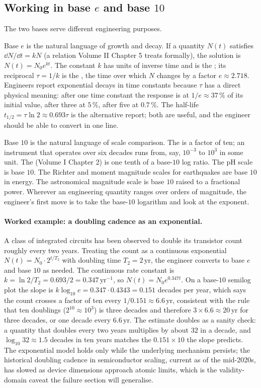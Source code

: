 \subsection{Working in base $e$ and base $10$}

The two bases serve different engineering purposes.

Base $e$ is the natural language of growth and decay. If a quantity
$N(t)$ satisfies $\dd N / \dd t = k N$ (a relation Volume II Chapter 5
treats formally), the solution is $N(t) = N_{0} e^{kt}$. The constant
$k$ has units of inverse time and is the ; its
reciprocal $\tau = 1/k$ is the , the time over
which $N$ changes by a factor $e \approx 2.718$. Engineers report
exponential decays in time constants because $\tau$ has a direct
physical meaning: after one time constant the response is at $1/e
\approx 37\,\%$ of its initial value, after three at $5\,\%$, after
five at $0.7\,\%$. The half-life $t_{1/2} = \tau \ln 2 \approx 0.693
\tau$ is the alternative report; both are useful, and the engineer
should be able to convert in one line.

Base $10$ is the natural language of scale comparison. The
 is a factor of ten; an instrument that operates over
six decades runs from, say, $10^{-3}$ to $10^{3}$ in some unit. The
 (Volume I Chapter 2) is one tenth of a base-$10$
log ratio. The pH scale is base $10$. The Richter and moment
magnitude scales for earthquakes are base $10$ in energy. The
astronomical magnitude scale is base $10$ raised to a fractional
power. Wherever an engineering quantity ranges over orders of
magnitude, the engineer's first move is to take the base-$10$
logarithm and look at the exponent.

\paragraph{Worked example: a doubling cadence as an exponential.}
A class of integrated circuits has been observed to double its
transistor count roughly every two years. Treating the count as a
continuous exponential $N(t) = N_{0} \cdot 2^{t/T_{2}}$ with doubling
time $T_{2} = 2\,\text{yr}$, the engineer converts to base $e$ and
base $10$ as needed. The continuous rate constant is $k = \ln 2/T_{2}
= 0.693/2 = 0.347\,\text{yr}^{-1}$, so $N(t) = N_{0} e^{0.347 t}$. On
a base-$10$ semilog plot the slope is $k \log_{10} e = 0.347 \cdot
0.4343 = 0.151$ decades per year, which says the count crosses a
factor of ten every $1/0.151 \approx 6.6\,\text{yr}$, consistent
with the rule that ten doublings ($2^{10} \approx 10^{3}$) is three
decades and therefore $3 \times 6.6 \approx 20\,\text{yr}$ for three
decades, or one decade every $6.6\,\text{yr}$. The estimate doubles
as a sanity check: a quantity that doubles every two years multiplies
by about $32$ in a decade, and $\log_{10} 32 \approx 1.5$ decades in
ten years matches the $0.151 \times 10$ the slope predicts. The
exponential model holds only while the underlying mechanism persists;
the historical doubling cadence in semiconductor scaling, current as
of the mid-2020s, has slowed as device dimensions approach atomic
limits, which is the validity-domain caveat the failure section will
generalise.

